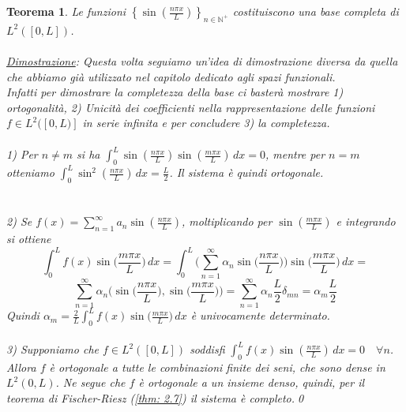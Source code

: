 \documentclass[a4paper,12pt]{report}
\newtheorem{teorema}{Teorema}[chapter]
\begin{document}
\begin{teorema}\label{app: .7}
Le funzioni $\left\{\sin\!\left(\frac{n\pi x}{L}\right)\right\}_{n\in\mathbb{N}^+}$ costituiscono una base completa di $L^2([0,L])$.
\\
\\ \underline{Dimostrazione}: Questa volta seguiamo un'idea di dimostrazione diversa da quella che abbiamo già utilizzato nel capitolo dedicato agli spazi funzionali.
\\Infatti per dimostrare la completezza della base ci basterà mostrare 1) ortogonalità, 2) Unicità dei coefficienti nella rappresentazione delle funzioni $f\in L^2([0,L)]$ in serie infinita e per concludere 3) la completezza.
\\
\\ 1) Per $n\neq m$ si ha $\int_0^L \sin\!\left(\frac{n\pi x}{L}\right)\sin\!\left(\frac{m\pi x}{L}\right)\,dx = 0$, mentre per $n=m$ otteniamo $\int_0^L \sin^2\!\left(\frac{n\pi x}{L}\right)\,dx = \frac{L}{2}$.
Il sistema è quindi ortogonale.
\\
\\
\\2) Se $f(x)=\sum_{n=1}^{\infty} a_n \sin\!\left(\frac{n\pi x}{L}\right)$, moltiplicando per $\sin\!\left(\frac{m\pi x}{L}\right)$ e integrando si ottiene
\[
\int_0^Lf(x)\sin\bigg(\frac{m\pi x}{L}\bigg)\,dx=\int_0^L\bigg(\sum_{n=1}^\infty\alpha_n\sin\bigg(\frac{n\pi x}{L}\bigg)\bigg)\sin\bigg(\frac{m\pi x}{L}\bigg)\,dx=
\] 
\[\sum_{n=1}^\infty\alpha_n\bigg(\sin\bigg(\frac{n\pi x}{L}\bigg), \sin\bigg(\frac{m\pi x}{L}  \bigg)\bigg)=\sum_{n=1}^\infty\alpha_n\frac{L}{2}\delta_{mn}=\alpha_m\frac{L}{2}
\]
Quindi $\alpha_m=\frac{2}{L}\int_0^Lf(x)\sin\bigg(\frac{m\pi x}{L}\bigg)\,dx$ è univocamente determinato.
\\
\\ 3) Supponiamo che $f\in L^2([0,L])$ soddisfi $\int_0^L f(x)\sin\!\left(\frac{n\pi x}{L}\right)\,dx = 0 \quad \forall n$. Allora $f$ è ortogonale a tutte le combinazioni finite dei seni, che sono dense in $L^2(0,L)$. Ne segue che $f$ è ortogonale a un insieme denso, quindi, per il teorema di Fischer-Riesz (\ref{thm: 2.7}) il sistema è completo.\qed

\end{teorema}
\end{document}
